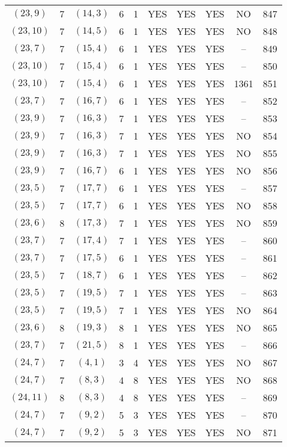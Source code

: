 \begin{longtable}{|c|c|c|c|c|c|c|c|c|c|}
$(23, 9)$ & 7 & $(14, 3)$ & 6 & 1 & YES & YES & YES & NO & 847\\
$(23, 10)$ & 7 & $(14, 5)$ & 6 & 1 & YES & YES & YES & NO & 848\\
$(23, 7)$ & 7 & $(15, 4)$ & 6 & 1 & YES & YES & YES & -- & 849\\
$(23, 10)$ & 7 & $(15, 4)$ & 6 & 1 & YES & YES & YES & -- & 850\\
$(23, 10)$ & 7 & $(15, 4)$ & 6 & 1 & YES & YES & YES & 1361 & 851\\
$(23, 7)$ & 7 & $(16, 7)$ & 6 & 1 & YES & YES & YES & -- & 852\\
$(23, 9)$ & 7 & $(16, 3)$ & 7 & 1 & YES & YES & YES & -- & 853\\
$(23, 9)$ & 7 & $(16, 3)$ & 7 & 1 & YES & YES & YES & NO & 854\\
$(23, 9)$ & 7 & $(16, 3)$ & 7 & 1 & YES & YES & YES & NO & 855\\
$(23, 9)$ & 7 & $(16, 7)$ & 6 & 1 & YES & YES & YES & NO & 856\\
$(23, 5)$ & 7 & $(17, 7)$ & 6 & 1 & YES & YES & YES & -- & 857\\
$(23, 5)$ & 7 & $(17, 7)$ & 6 & 1 & YES & YES & YES & NO & 858\\
$(23, 6)$ & 8 & $(17, 3)$ & 7 & 1 & YES & YES & YES & NO & 859\\
$(23, 7)$ & 7 & $(17, 4)$ & 7 & 1 & YES & YES & YES & -- & 860\\
$(23, 7)$ & 7 & $(17, 5)$ & 6 & 1 & YES & YES & YES & -- & 861\\
$(23, 5)$ & 7 & $(18, 7)$ & 6 & 1 & YES & YES & YES & -- & 862\\
$(23, 5)$ & 7 & $(19, 5)$ & 7 & 1 & YES & YES & YES & -- & 863\\
$(23, 5)$ & 7 & $(19, 5)$ & 7 & 1 & YES & YES & YES & NO & 864\\
$(23, 6)$ & 8 & $(19, 3)$ & 8 & 1 & YES & YES & YES & NO & 865\\
$(23, 7)$ & 7 & $(21, 5)$ & 8 & 1 & YES & YES & YES & -- & 866\\
$(24, 7)$ & 7 & $(4, 1)$ & 3 & 4 & YES & YES & YES & NO & 867\\
$(24, 7)$ & 7 & $(8, 3)$ & 4 & 8 & YES & YES & YES & NO & 868\\
$(24, 11)$ & 8 & $(8, 3)$ & 4 & 8 & YES & YES & YES & -- & 869\\
$(24, 7)$ & 7 & $(9, 2)$ & 5 & 3 & YES & YES & YES & -- & 870\\
$(24, 7)$ & 7 & $(9, 2)$ & 5 & 3 & YES & YES & YES & NO & 871\\

\end{longtable}
